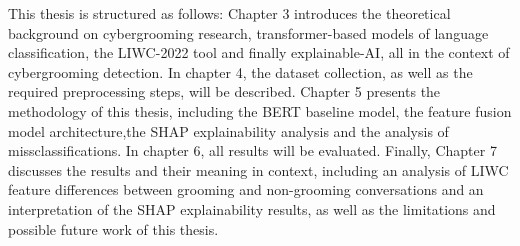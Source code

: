 This thesis is structured as follows: Chapter 3 introduces the theoretical background on cybergrooming research, transformer-based models of language classification, the LIWC-2022 tool and finally explainable-AI, all in the context of cybergrooming detection. In chapter 4, the dataset collection, as well as the required preprocessing steps, will be described. Chapter 5 presents the methodology of this thesis, including the BERT baseline model, the feature fusion model architecture,the SHAP explainability analysis and the analysis of missclassifications. In chapter 6, all results will be evaluated. Finally, Chapter 7 discusses the results and their meaning in context, including an analysis of LIWC feature differences between grooming and non-grooming conversations and an interpretation of the SHAP explainability results, as well as the limitations and possible future work of this thesis.

